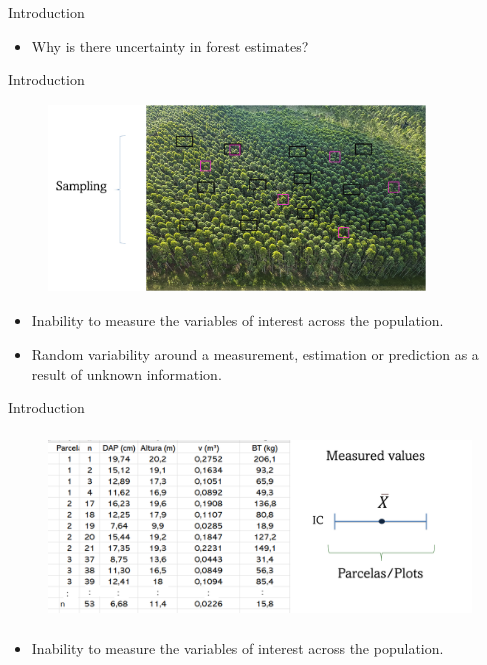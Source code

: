 \documentclass{beamer}
\begin{document}
\begin{frame}{Introduction}
\begin{itemize}
    \item Why is there uncertainty in forest estimates?
\end{itemize}
\end{frame}

\begin{frame}{Introduction}
\begin{figure}
        \centering
        \includegraphics[width = 10cm, height = 5cm]{pic/Imagem1.jpg}
        \end{figure}
\begin{itemize}
    \item Inability to measure the variables of interest across the population.
    \item Random variability around a measurement, estimation or prediction as a result of unknown information.
\end{itemize}

\end{frame}

\begin{frame}{Introduction}
\begin{figure}
        \centering
        \includegraphics[width = 12cm, height = 5cm]{pic/Imagem2.png}
        \end{figure}
\begin{itemize}
    \item Inability to measure the variables of interest across the population.
\end{itemize}
\end{frame}
\end{document}
